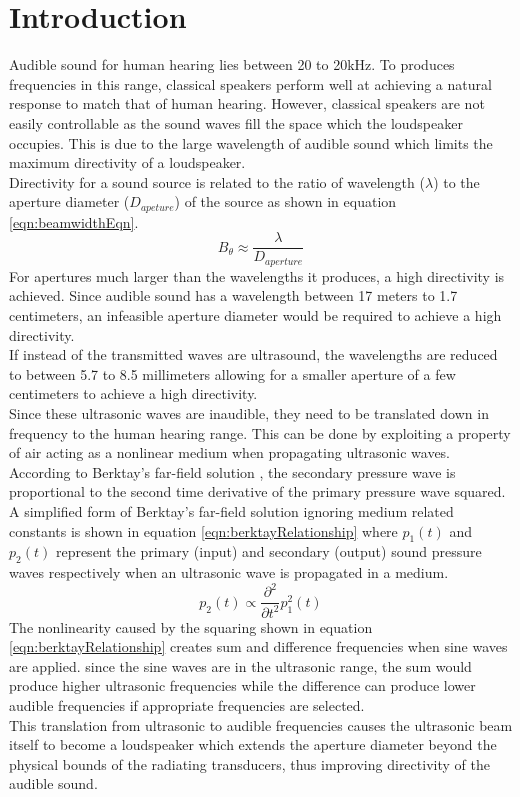 \section{Introduction}
Audible sound for human hearing lies between 20 to 20kHz. To produces frequencies in this range, classical speakers perform well at achieving a natural response to match that of human hearing. However, classical speakers are not easily controllable as the sound waves fill the space which the loudspeaker occupies. This is due to the large wavelength of audible sound which limits the maximum directivity of a loudspeaker.\\
Directivity for a sound source is related to the ratio of wavelength ($\lambda$) to the aperture diameter ($D_{apeture}$) of the source as shown in equation \ref{eqn:beamwidthEqn}.
\begin{equation}
    B_\theta \approx \frac{\lambda}{D_{aperture}}
    \label{eqn:beamwidthEqn}
\end{equation}
For apertures much larger than the wavelengths it produces, a high directivity is achieved. Since audible sound has a wavelength between 17 meters to 1.7 centimeters, an infeasible aperture diameter would be required to achieve a high directivity.\\
If instead of the transmitted waves are ultrasound, the wavelengths are reduced to between 5.7 to 8.5 millimeters allowing for a smaller aperture of a few centimeters to achieve a high directivity.\\

Since these ultrasonic waves are inaudible, they need to be translated down in frequency to the human hearing range. This can be done by exploiting a property of air acting as a nonlinear medium when propagating ultrasonic waves. According to Berktay's far-field solution \cite{berktay_1965}, the secondary pressure wave is proportional to the second time derivative of the primary pressure wave squared. A simplified form of Berktay's far-field solution ignoring medium related constants is shown in equation \ref{eqn:berktayRelationship} where $p_1 (t)$ and $p_2 (t)$ represent the primary (input) and secondary (output) sound pressure waves respectively when an ultrasonic wave is propagated in a medium.
\begin{equation}
    p_2(t) \propto \frac{\partial^2}{\partial t^2}p_1^2(t)
    \label{eqn:berktayRelationship}
\end{equation}
The nonlinearity caused by the squaring shown in equation \ref{eqn:berktayRelationship} creates sum and difference frequencies when sine waves are applied. since the sine waves are in the ultrasonic range, the sum would produce higher ultrasonic frequencies while the difference can produce lower audible frequencies if appropriate frequencies are selected.\\
This translation from ultrasonic to audible frequencies causes the ultrasonic beam itself to become a loudspeaker which extends the aperture diameter beyond the physical bounds of the radiating transducers, thus improving directivity of the audible sound.\\

